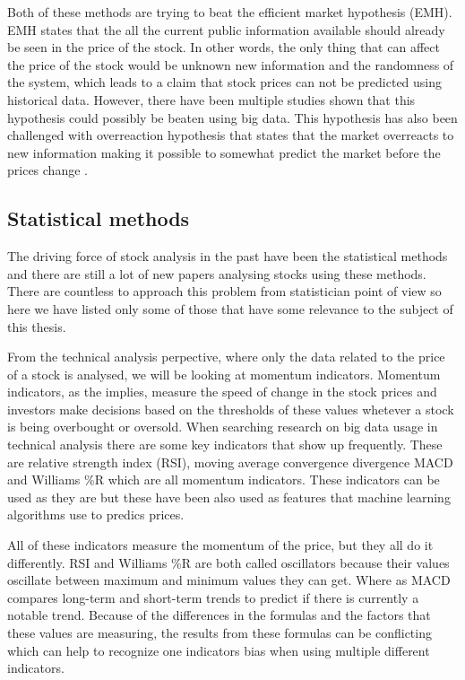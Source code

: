 Both of these methods are trying to beat the efficient market hypothesis (EMH).
EMH states that the all the current public information available should already be seen in the price of the stock.
In other words, the only thing that can affect the price of the stock would be unknown new information and the randomness of the system, which leads to a claim that stock prices can not be predicted using historical data.
However, there have been multiple studies shown that this hypothesis could possibly be beaten using big data. \cite{nam}
This hypothesis has also been challenged with overreaction hypothesis that states that the market overreacts to new information making it possible to somewhat predict the market before the prices change \cite{day}.

\subsection{Statistical methods}

The driving force of stock analysis in the past have been the statistical methods and there are still a lot of new papers analysing stocks using these methods.
There are countless to approach this problem from statistician point of view so here we have listed only some of those that have some relevance to the subject of this thesis.

From the technical analysis perpective, where only the data related to the price of a stock is analysed, we will be looking at momentum indicators. \cite{utthammajai}
Momentum indicators, as the implies, measure the speed of change in the stock prices and investors make decisions based on the thresholds of these values whetever a stock is being overbought or oversold. \cite{james}
When searching research on big data usage in technical analysis there are some key indicators that show up frequently.
These are relative strength index (RSI), moving average convergence divergence MACD and Williams \%R which are all momentum indicators.
These indicators can be used as they are but these have been also used as features that machine learning algorithms use to predics prices. \cite{serez}

All of these indicators measure the momentum of the price, but they all do it differently.
RSI and Williams \%R are both called oscillators because their values oscillate between maximum and minimum values they can get.
Where as MACD compares long-term and short-term trends to predict if there is currently a notable trend.
Because of the differences in the formulas and the factors that these values are measuring, the results from these formulas can be conflicting which can help to recognize one indicators bias when using multiple different indicators. \cite{james}

